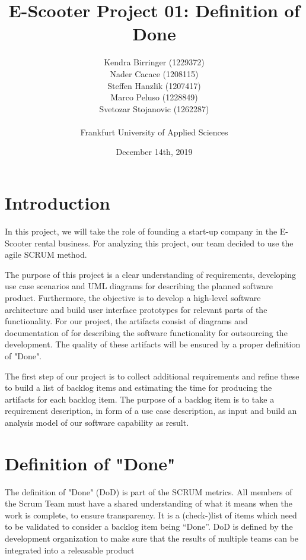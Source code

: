 \documentclass[a4paper, 12pt]{article}
\title{E-Scooter Project 01: Definition of Done}
\author{
    Kendra Birringer (1229372)\\
    Nader Cacace (1208115)\\
    Steffen Hanzlik (1207417)\\
    Marco Peluso (1228849)\\
    Svetozar Stojanovic (1262287)\\
    \\
    Frankfurt University of Applied Sciences
}
\date{December 14th, 2019}
\begin{document}
\maketitle
\newpage
\tableofcontents

\newpage
\section{Introduction}
In this project, we will take the role of founding a start-up company in the E-Scooter rental business.
For analyzing this project, our team decided to use the agile SCRUM method.

The purpose of this project is a clear understanding of requirements, developing use case scenarios and UML diagrams for describing the planned software product.
Furthermore, the objective is to develop a high-level software architecture and build user interface prototypes for relevant parts of the functionality.
For our project, the artifacts consist of diagrams and documentation of for describing the software functionality for outsourcing the development. The quality of these artifacts will be ensured by a proper definition of "Done".

The first step of our project is to collect additional requirements and refine these to build a list of backlog items and estimating the time for producing the artifacts for each backlog item. The purpose of a backlog item is to take a requirement description, in form of a use case description, as input and build an analysis model of our software capability as result.

\section{Definition of "Done"}
The definition of "Done" (DoD) is part of the SCRUM metrics. All members of the Scrum Team must have a shared understanding of what it means when the work is complete, to ensure transparency. \cite{scrumguide}
It is a (check-)list of items which need to be validated to consider a backlog item being “Done”. DoD is defined by the development organization to make sure that the results of multiple teams can be integrated into a releasable product  \cite{thoma1}
\end{document}
